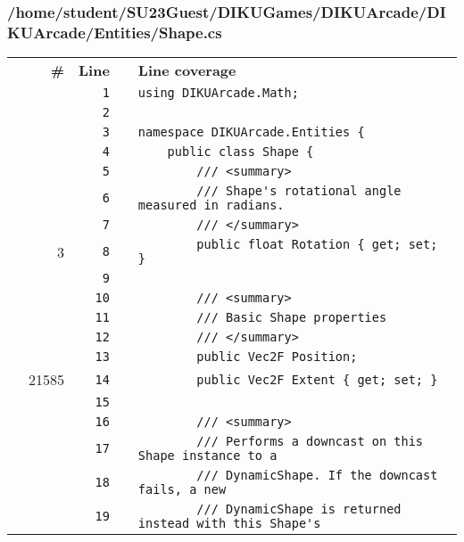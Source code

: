 \documentclass[a4paper,landscape,10pt]{article}
\begin{document}
\subsubsection{/home/student/SU23Guest/DIKUGames/DIKUArcade/DIKUArcade/Entities/Shape.cs}
\begin{longtable}[l]{lrrll}
\textbf{} & \textbf{\#} & \textbf{Line} & \textbf{} & \textbf{Line coverage}\\
\cellcolor{gray} &  & \verb~1~ & & \verb~using DIKUArcade.Math;~\\
\cellcolor{gray} &  & \verb~2~ & & \verb~~\\
\cellcolor{gray} &  & \verb~3~ & & \verb~namespace DIKUArcade.Entities {~\\
\cellcolor{gray} &  & \verb~4~ & & \verb~    public class Shape {~\\
\cellcolor{gray} &  & \verb~5~ & & \verb~        /// <summary>~\\
\cellcolor{gray} &  & \verb~6~ & & \verb~        /// Shape's rotational angle measured in radians.~\\
\cellcolor{gray} &  & \verb~7~ & & \verb~        /// </summary>~\\
\cellcolor{green} & 3 & \verb~8~ & & \verb~        public float Rotation { get; set; }~\\
\cellcolor{gray} &  & \verb~9~ & & \verb~~\\
\cellcolor{gray} &  & \verb~10~ & & \verb~        /// <summary>~\\
\cellcolor{gray} &  & \verb~11~ & & \verb~        /// Basic Shape properties~\\
\cellcolor{gray} &  & \verb~12~ & & \verb~        /// </summary>~\\
\cellcolor{gray} &  & \verb~13~ & & \verb~        public Vec2F Position;~\\
\cellcolor{green} & 21585 & \verb~14~ & & \verb~        public Vec2F Extent { get; set; }~\\
\cellcolor{gray} &  & \verb~15~ & & \verb~~\\
\cellcolor{gray} &  & \verb~16~ & & \verb~        /// <summary>~\\
\cellcolor{gray} &  & \verb~17~ & & \verb~        /// Performs a downcast on this Shape instance to a~\\
\cellcolor{gray} &  & \verb~18~ & & \verb~        /// DynamicShape. If the downcast fails, a new~\\
\cellcolor{gray} &  & \verb~19~ & & \verb~        /// DynamicShape is returned instead with this Shape's~\\

\end{longtable}
\end{document}
